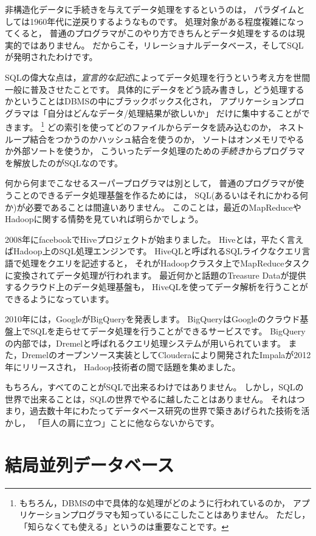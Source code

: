 非構造化データに手続きを与えてデータ処理をするというのは，
パラダイムとしては1960年代に逆戻りするようなものです。
処理対象がある程度複雑になってくると，
普通のプログラマがこのやり方できちんとデータ処理をするのは現実的ではありません。
だからこそ，リレーショナルデータベース，そしてSQLが発明されたわけです。

SQLの偉大な点は，{\em 宣言的な記述}によってデータ処理を行うという考え方を世間一般に普及させたことです。
具体的にデータをどう読み書きし，どう処理するかということはDBMSの中にブラックボックス化され，
アプリケーションプログラマは「自分はどんなデータ/処理結果が欲しいか」
だけに集中することができます。
\footnote{もちろん，DBMSの中で具体的な処理がどのように行われているのか，
アプリケーションプログラマも知っているにこしたことはありません。
ただし，「知らなくても使える」というのは重要なことです。}
どの索引を使ってどのファイルからデータを読み込むのか，
ネストループ結合をつかうのかハッシュ結合を使うのか，
ソートはオンメモリでやるか外部ソートを使うか，
こういったデータ処理のための{\em 手続き}からプログラマを解放したのがSQLなのです。

何から何までこなせるスーパープログラマは別として，
普通のプログラマが使うことのできるデータ処理基盤を作るためには，
SQL(あるいはそれにかわる何か)が必要であることは間違いありません。
このことは，最近のMapReduceやHadoopに関する情勢を見ていれば明らかでしょう。

2008年にfacebookでHiveプロジェクトが始まりました。
Hiveとは，平たく言えばHadoop上のSQL処理エンジンです。
HiveQLと呼ばれるSQLライクなクエリ言語で処理をクエリを記述すると，
それがHadoopクラスタ上でMapReduceタスクに変換されてデータ処理が行われます。
最近何かと話題のTreasure Dataが提供するクラウド上のデータ処理基盤も，
HiveQLを使ってデータ解析を行うことができるようになっています。

2010年には，GoogleがBigQueryを発表します。
BigQueryはGoogleのクラウド基盤上でSQLを走らせてデータ処理を行うことができるサービスです。
BigQueryの内部では，Dremelと呼ばれるクエリ処理システムが用いられています。
また，Dremelのオープンソース実装としてClouderaにより開発されたImpalaが2012年にリリースされ，
Hadoop技術者の間で話題を集めました。

もちろん，すべてのことがSQLで出来るわけではありません。
しかし，SQLの世界で出来ることは，SQLの世界でやるに越したことはありません。
それはつまり，過去数十年にわたってデータベース研究の世界で築きあげられた技術を活かし，
「巨人の肩に立つ」ことに他ならないからです。

\section{結局並列データベース}

